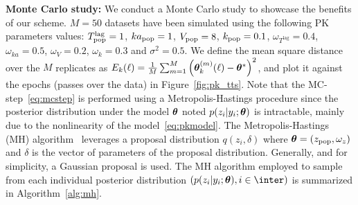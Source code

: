 \documentclass[12pt]{article}
\begin{document}
\vspace{0.15in}
\noindent \textbf{Monte Carlo study:}
We conduct a Monte Carlo study to showcase the benefits of our scheme.
$M=50$ datasets have been simulated using the following PK parameters values:
$T^{\textrm{lag}}_{\rm pop} =1$, $ka_{\rm pop} =1$, $V_{\rm pop}= 8$, $k_{\rm pop}=0.1$, $ \omega_{T^{\textrm{lag}}}=0.4$, $\omega_{ka}=0.5$, $\omega_{V}=0.2$, $\omega_{k}=0.3$ and $\sigma^2=0.5$.
We define the mean square distance over the $M$ replicates as $E_k(\ell) = \frac{1}{M}\sum_{m=1}^{M}{\left({\bm{\theta}}_k^{(m)}(\ell) - {\bm{\theta}}^* \right)^2} $, and plot it against the epochs (passes over the data) in Figure~\ref{fig:pk_tts}.	
Note that the { MC-step}~\eqref{eq:mcstep} is performed using a Metropolis-Hastings procedure since the posterior distribution under the model ${\bm{\theta}}$ noted $p(z_i | y_i; {\bm{\theta}})$ is intractable, mainly due to the nonlinearity of the model~\eqref{eq:pkmodel}.
The Metropolis-Hastings (MH) algorithm~\citep{meyn2012markov} leverages a proposal distribution $q(z_{i}, \delta)$ where ${\bm{\theta}} = (z_{\rm pop}, \omega_{z})$ and $ \delta$ is the vector of parameters of the proposal distribution. Generally, and for simplicity, a Gaussian proposal is used. 
The MH algorithm employed to sample from each individual posterior distribution $\left(p(z_i | y_i; \param), i\in \inter \right)$ is summarized in Algorithm~\ref{alg:mh}.
\end{document}

